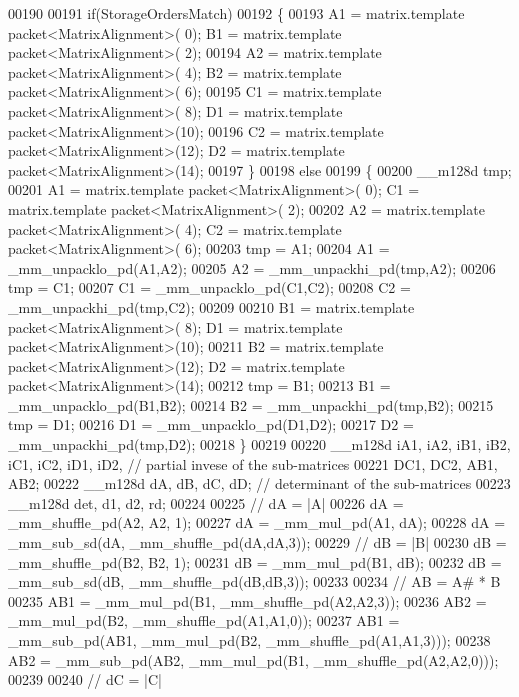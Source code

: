 \begin{DoxyCode}
00190     
00191     \textcolor{keywordflow}{if}(StorageOrdersMatch)
00192     \{
00193       A1 = matrix.template packet<MatrixAlignment>( 0); B1 = matrix.template packet<MatrixAlignment>( 2);
00194       A2 = matrix.template packet<MatrixAlignment>( 4); B2 = matrix.template packet<MatrixAlignment>( 6);
00195       C1 = matrix.template packet<MatrixAlignment>( 8); D1 = matrix.template packet<MatrixAlignment>(10);
00196       C2 = matrix.template packet<MatrixAlignment>(12); D2 = matrix.template packet<MatrixAlignment>(14);
00197     \}
00198     \textcolor{keywordflow}{else}
00199     \{
00200       \_\_m128d tmp;
00201       A1 = matrix.template packet<MatrixAlignment>( 0); C1 = matrix.template packet<MatrixAlignment>( 2);
00202       A2 = matrix.template packet<MatrixAlignment>( 4); C2 = matrix.template packet<MatrixAlignment>( 6);
00203       tmp = A1;
00204       A1 = \_mm\_unpacklo\_pd(A1,A2);
00205       A2 = \_mm\_unpackhi\_pd(tmp,A2);
00206       tmp = C1;
00207       C1 = \_mm\_unpacklo\_pd(C1,C2);
00208       C2 = \_mm\_unpackhi\_pd(tmp,C2);
00209       
00210       B1 = matrix.template packet<MatrixAlignment>( 8); D1 = matrix.template packet<MatrixAlignment>(10);
00211       B2 = matrix.template packet<MatrixAlignment>(12); D2 = matrix.template packet<MatrixAlignment>(14);
00212       tmp = B1;
00213       B1 = \_mm\_unpacklo\_pd(B1,B2);
00214       B2 = \_mm\_unpackhi\_pd(tmp,B2);
00215       tmp = D1;
00216       D1 = \_mm\_unpacklo\_pd(D1,D2);
00217       D2 = \_mm\_unpackhi\_pd(tmp,D2);
00218     \}
00219     
00220     \_\_m128d iA1, iA2, iB1, iB2, iC1, iC2, iD1, iD2,     \textcolor{comment}{// partial invese of the sub-matrices}
00221             DC1, DC2, AB1, AB2;
00222     \_\_m128d dA, dB, dC, dD;     \textcolor{comment}{// determinant of the sub-matrices}
00223     \_\_m128d det, d1, d2, rd;
00224 
00225     \textcolor{comment}{//  dA = |A|}
00226     dA = \_mm\_shuffle\_pd(A2, A2, 1);
00227     dA = \_mm\_mul\_pd(A1, dA);
00228     dA = \_mm\_sub\_sd(dA, \_mm\_shuffle\_pd(dA,dA,3));
00229     \textcolor{comment}{//  dB = |B|}
00230     dB = \_mm\_shuffle\_pd(B2, B2, 1);
00231     dB = \_mm\_mul\_pd(B1, dB);
00232     dB = \_mm\_sub\_sd(dB, \_mm\_shuffle\_pd(dB,dB,3));
00233 
00234     \textcolor{comment}{//  AB = A# * B}
00235     AB1 = \_mm\_mul\_pd(B1, \_mm\_shuffle\_pd(A2,A2,3));
00236     AB2 = \_mm\_mul\_pd(B2, \_mm\_shuffle\_pd(A1,A1,0));
00237     AB1 = \_mm\_sub\_pd(AB1, \_mm\_mul\_pd(B2, \_mm\_shuffle\_pd(A1,A1,3)));
00238     AB2 = \_mm\_sub\_pd(AB2, \_mm\_mul\_pd(B1, \_mm\_shuffle\_pd(A2,A2,0)));
00239 
00240     \textcolor{comment}{//  dC = |C|}

\end{DoxyCode}
